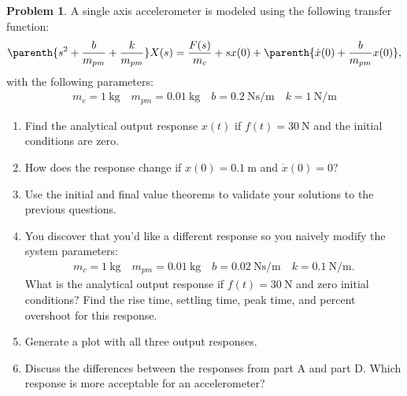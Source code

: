\documentclass[10pt]{article}
\theoremstyle{definition}
\newtheorem{prob}{Problem}[section]
\newenvironment{subprob}%
{\renewcommand{\theenumi}{\alph{enumi}}\renewcommand{\labelenumi}{(\theenumi)}\begin{enumerate}}%
{\end{enumerate}}%
\begin{document}
\begin{prob}
    A single axis accelerometer is modeled using the following transfer function:
    \begin{align}
        \parenth{s^2 + \frac{b}{m_{pm}} + \frac{k}{m_{pm}}} X(s) = \frac{F(s)}{m_c} + s x(0) + \parenth{\dot{x}(0) + \frac{b}{m_{pm}} x(0)},
    \end{align}
    with the following parameters:
    \begin{align*}
        m_c = \SI{1}{\kilo\gram} \quad m_{pm} = \SI{0.01}{\kilo\gram} \quad b = \SI{0.2}{\newton\second\per\meter} \quad k = \SI{1}{\newton\per\meter}
    \end{align*}

    \begin{subprob}
        \item Find the analytical output response \( x(t) \) if \( f(t) = \SI{30}{\newton}\) and the initial conditions are zero.
        \item How does the response change if \( x(0) = \SI{0.1}{\meter} \) and \( \dot{x}(0) = 0 \)?
        \item Use the initial and final value theorems to validate your solutions to the previous questions.
        \item You discover that you'd like a different response so you naively modify the system parameters:
            \begin{align*}
        m_c = \SI{1}{\kilo\gram} \quad m_{pm} = \SI{0.01}{\kilo\gram} \quad b = \SI{0.02}{\newton\second\per\meter} \quad k = \SI{0.1}{\newton\per\meter}.
            \end{align*}
            What is the analytical output response if \( f(t) = \SI{30}{\newton} \) and zero initial conditions?
            Find the rise time, settling time, peak time, and percent overshoot for this response.
        \item Generate a plot with all three output responses.
        \item Discuss the differences between the responses from part A and part D.
            Which response is more acceptable for an accelerometer?
    \end{subprob}
\end{prob}
  
\end{document}
